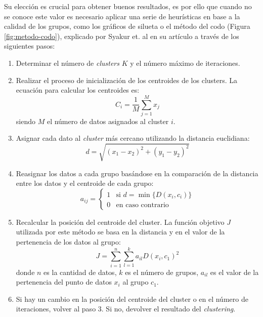 Su elección es crucial para obtener buenos resultados, es por ello que cuando no se conoce este valor es necesario aplicar una serie de heurísticas en base a la calidad de los grupos, como los gráficos de silueta \cite{10.1007/978-3-030-52348-0_2} o el método del codo (Figura \ref{fig:metodo-codo}), explicado por Syakur et. al \cite{Syakur_2018} en su artículo a través de los siguientes pasos:

\begin{enumerate}
    \item Determinar el número de \textit{clusters} \( K \) y el número máximo de iteraciones.
    \item Realizar el proceso de inicialización de los centroides de los clusters. La ecuación para calcular los centroides es:
    \begin{equation}
    C_i = \frac{1}{M} \sum_{j=1}^{M} x_j
    \end{equation}
    siendo \( M \) el número de datos asignados al cluster \( i \). 
    \item Asignar cada dato al \textit{cluster} más cercano utilizando la distancia euclidiana:
    \begin{equation}
    d = \sqrt{(x_1 - x_2)^2 + (y_1 - y_2)^2}
    \end{equation}
    \item Reasignar los datos a cada grupo basándose en la comparación de la distancia entre los datos y el centroide de cada grupo:
    \begin{equation}
    a_{ij} = \begin{cases} 
    1 & \text{si } d = \min \{D(x_i, c_i)\} \\
    0 & \text{en caso contrario}
    \end{cases}
    \end{equation}
    \item Recalcular la posición del centroide del cluster. La función objetivo \( J \) utilizada por este método se basa en la distancia y en el valor de la pertenencia de los datos al grupo:
    \begin{equation}
    J = \sum_{i=1}^{n} \sum_{l=1}^{k} a_{il} D(x_i, c_1)^2
    \end{equation}
    donde \( n \) es la cantidad de datos, \( k \) es el número de grupos, \( a_{il} \) es el valor de la pertenencia del punto de datos \( x_i \) al grupo \( c_1 \).
    \item Si hay un cambio en la posición del centroide del cluster o en el número de iteraciones, volver al paso 3. Si no, devolver el resultado del \textit{clustering}.
\end{enumerate}

